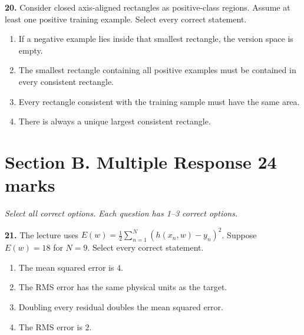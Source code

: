 \documentclass[11pt,a4paper]{article}
\begin{document}
\par\noindent\begin{minipage}{\linewidth}
\textbf{20.} Consider closed axis-aligned rectangles as positive-class regions. Assume at least one positive training example. Select every correct statement.
\begin{enumerate}[label=(\Alph*),leftmargin=8mm,itemsep=2pt,topsep=2pt]
\item If a negative example lies inside that smallest rectangle, the version space is empty.
\item The smallest rectangle containing all positive examples must be contained in every consistent rectangle.
\item Every rectangle consistent with the training sample must have the same area.
\item There is always a unique largest consistent rectangle.
\end{enumerate}

\end{minipage}\par\vspace{3mm}
\newpage\section*{Section B. Multiple Response \hfill 24 marks}
\textit{Select all correct options. Each question has 1--3 correct options.}\par
\par\noindent\begin{minipage}{\linewidth}
\textbf{21.} The lecture uses \(E(w)=\tfrac12\sum_{n=1}^N(h(x_n,w)-y_n)^2\). Suppose \(E(w)=18\) for \(N=9\). Select every correct statement.
\begin{enumerate}[label=(\Alph*),leftmargin=8mm,itemsep=2pt,topsep=2pt]
\item The mean squared error is \(4\).
\item The RMS error has the same physical units as the target.
\item Doubling every residual doubles the mean squared error.
\item The RMS error is \(2\).
\end{enumerate}

\end{minipage}\par\vspace{3mm}
\end{document}
